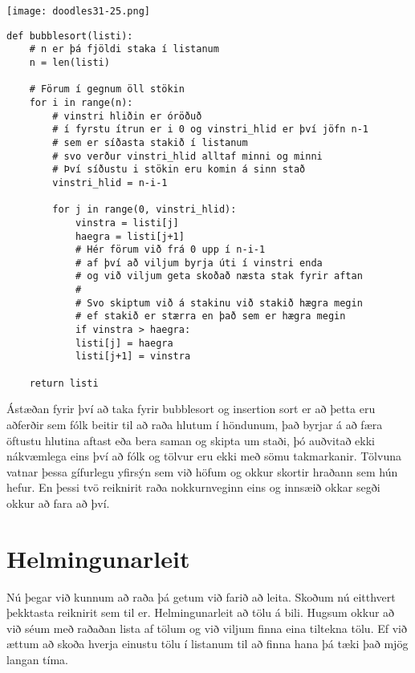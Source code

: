 \phantom{easter egg}
\begin{center}
	\texttt{[image: doodles31-25.png]}
\end{center}

\begin{lstlisting}[caption=Bubble sort reikniritið, label=lst:reiknirit-bubble]
	def bubblesort(listi):
	# n er þá fjöldi staka í listanum
	n = len(listi)
	
	# Förum í gegnum öll stökin
	for i in range(n):
		# vinstri hliðin er óröðuð 
		# í fyrstu ítrun er i 0 og vinstri_hlid er því jöfn n-1
		# sem er síðasta stakið í listanum
		# svo verður vinstri_hlid alltaf minni og minni
		# Því síðustu i stökin eru komin á sinn stað
		vinstri_hlid = n-i-1
		
		for j in range(0, vinstri_hlid):
			vinstra = listi[j]
			haegra = listi[j+1]
			# Hér förum við frá 0 upp í n-i-1
			# af því að viljum byrja úti í vinstri enda 
			# og við viljum geta skoðað næsta stak fyrir aftan
			# 
			# Svo skiptum við á stakinu við stakið hægra megin
			# ef stakið er stærra en það sem er hægra megin
			if vinstra > haegra:
			listi[j] = haegra
			listi[j+1] = vinstra
		
	return listi
\end{lstlisting}

Ástæðan fyrir því að taka fyrir bubblesort og insertion sort er að þetta eru aðferðir sem fólk beitir til að raða hlutum í höndunum, það byrjar á að færa öftustu hlutina aftast eða bera saman og skipta um staði, þó auðvitað ekki nákvæmlega eins því að fólk og tölvur eru ekki með sömu takmarkanir. 
Tölvuna vatnar þessa gífurlegu yfirsýn sem við höfum og okkur skortir hraðann sem hún hefur.
En þessi tvö reiknirit raða nokkurnveginn eins og innsæið okkar segði okkur að fara að því.


\section{Helmingunarleit}\label{uk:reiknirit-helmingunarleit}
Nú þegar við kunnum að raða þá getum við farið að leita.
Skoðum nú eitthvert þekktasta reiknirit sem til er. 
Helmingunarleit að tölu á bili. 
Hugsum okkur að við séum með raðaðan lista af tölum og við viljum finna eina tiltekna tölu. 
Ef við ættum að skoða hverja einustu tölu í listanum til að finna hana þá tæki það mjög langan tíma.

